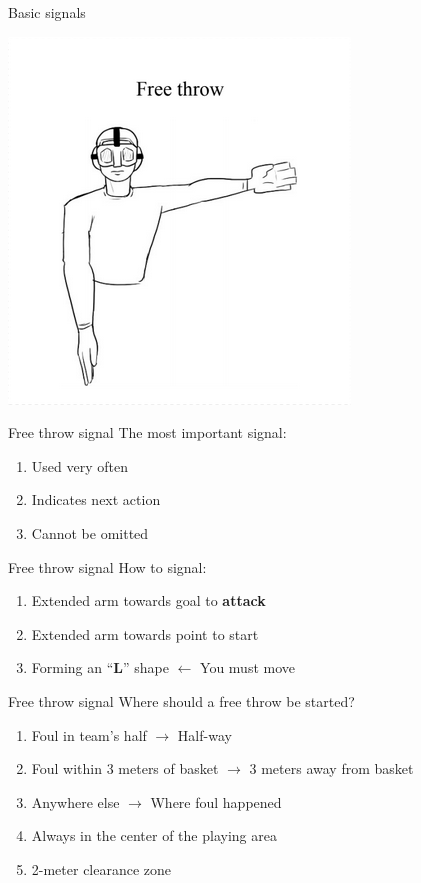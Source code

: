 \begin{frame}{Basic signals}
    \begin{center}
        \includegraphics[scale=0.8]{freeThrowSignal}
    \end{center}
\end{frame}

\begin{frame}{Free throw signal}
    The most important signal:
    \begin{enumerate}
        \item Used very often
        \item Indicates next action
        \item Cannot be omitted
    \end{enumerate}
\end{frame}

\begin{frame}{Free throw signal}
    How to signal:
    \begin{enumerate}
        \item Extended arm towards goal to \textbf{attack}
        \item Extended arm towards point to start

              \pause{}

        \item Forming an ``\textbf{L}'' shape \pause{} $\leftarrow$ You must move
    \end{enumerate}
\end{frame}

\begin{frame}{Free throw signal}
    Where should a free throw be started?

    \begin{enumerate}
        \item Foul in team's half $\rightarrow$ Half-way
        \item Foul within 3 meters of basket $\rightarrow$ 3 meters away from basket
        \item Anywhere else $\rightarrow$ Where foul happened
        \item Always in the center of the playing area
        \item 2-meter clearance zone
    \end{enumerate}
\end{frame}